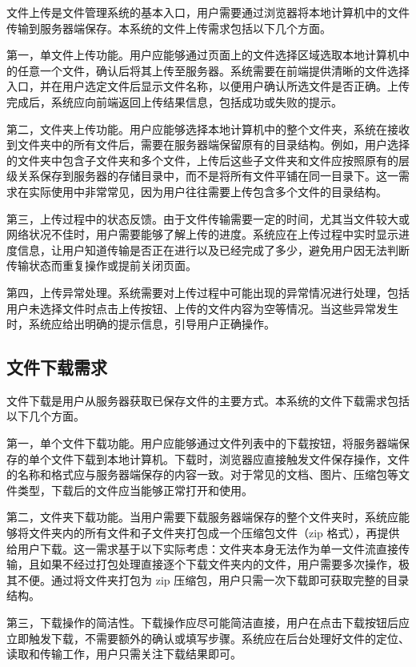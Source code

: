 \documentclass[UTF8,zihao=-4]{ctexrep}
\begin{document}
文件上传是文件管理系统的基本入口，用户需要通过浏览器将本地计算机中的文件传输到服务器端保存。本系统的文件上传需求包括以下几个方面。

第一，单文件上传功能。用户应能够通过页面上的文件选择区域选取本地计算机中的任意一个文件，确认后将其上传至服务器。系统需要在前端提供清晰的文件选择入口，并在用户选定文件后显示文件名称，以便用户确认所选文件是否正确。上传完成后，系统应向前端返回上传结果信息，包括成功或失败的提示。

第二，文件夹上传功能。用户应能够选择本地计算机中的整个文件夹，系统在接收到文件夹中的所有文件后，需要在服务器端保留原有的目录结构。例如，用户选择的文件夹中包含子文件夹和多个文件，上传后这些子文件夹和文件应按照原有的层级关系保存到服务器的存储目录中，而不是将所有文件平铺在同一目录下。这一需求在实际使用中非常常见，因为用户往往需要上传包含多个文件的目录结构。

第三，上传过程中的状态反馈。由于文件传输需要一定的时间，尤其当文件较大或网络状况不佳时，用户需要能够了解上传的进度。系统应在上传过程中实时显示进度信息，让用户知道传输是否正在进行以及已经完成了多少，避免用户因无法判断传输状态而重复操作或提前关闭页面。

第四，上传异常处理。系统需要对上传过程中可能出现的异常情况进行处理，包括用户未选择文件时点击上传按钮、上传的文件内容为空等情况。当这些异常发生时，系统应给出明确的提示信息，引导用户正确操作。

\subsection{文件下载需求}

文件下载是用户从服务器获取已保存文件的主要方式。本系统的文件下载需求包括以下几个方面。

第一，单个文件下载功能。用户应能够通过文件列表中的下载按钮，将服务器端保存的单个文件下载到本地计算机。下载时，浏览器应直接触发文件保存操作，文件的名称和格式应与服务器端保存的内容一致。对于常见的文档、图片、压缩包等文件类型，下载后的文件应当能够正常打开和使用。

第二，文件夹下载功能。当用户需要下载服务器端保存的整个文件夹时，系统应能够将文件夹内的所有文件和子文件夹打包成一个压缩包文件（zip 格式），再提供给用户下载。这一需求基于以下实际考虑：文件夹本身无法作为单一文件流直接传输，且如果不经过打包处理直接逐个下载文件夹内的文件，用户需要多次操作，极其不便。通过将文件夹打包为 zip 压缩包，用户只需一次下载即可获取完整的目录结构。

第三，下载操作的简洁性。下载操作应尽可能简洁直接，用户在点击下载按钮后应立即触发下载，不需要额外的确认或填写步骤。系统应在后台处理好文件的定位、读取和传输工作，用户只需关注下载结果即可。
\end{document}
